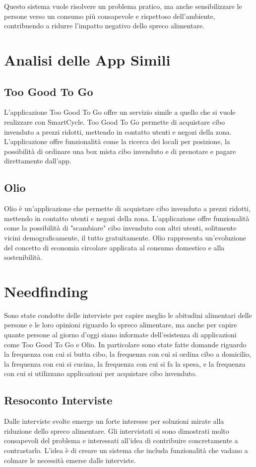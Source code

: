 \documentclass{article}
\begin{document}
Questo sistema vuole risolvere un problema pratico, ma anche sensibilizzare le persone verso un consumo più consapevole e rispettoso dell’ambiente, contribuendo a ridurre l’impatto negativo dello spreco alimentare.

\section{Analisi delle App Simili}
\subsection{Too Good To Go}
L'applicazione Too Good To Go offre un servizio simile a quello che si vuole realizzare con SmartCycle.
Too Good To Go permette di acquistare cibo invenduto a prezzi ridotti, mettendo in contatto utenti e negozi della zona.
L'applicazione offre funzionalità come la ricerca dei locali per posizione, la possibilità di ordinare una box mista cibo invenduto e di prenotare e pagare direttamente dall'app.

\subsection{Olio}
Olio è un'applicazione che permette di acquistare cibo invenduto a prezzi ridotti, mettendo in contatto utenti e negozi della zona.
L'applicazione offre funzionalità come la possibilità di "scambiare" cibo invenduto con altri utenti, solitmente vicini demograficamente, il tutto gratuitamente.
Olio rappresenta un’evoluzione del concetto di economia circolare applicata al consumo domestico e alla sostenibilità.

\section{Needfinding}
Sono state condotte delle interviste per capire meglio le abitudini alimentari delle persone e le loro opinioni riguardo lo spreco alimentare, ma anche per capire quante persone al giorno d'oggi siano informate dell'esistenza di applicazioni come Too Good To Go e Olio.
In particolare sono state fatte domande riguardo la frequenza con cui si butta cibo, la frequenza con cui si ordina cibo a domicilio, la frequenza con cui si cucina, la frequenza con cui si fa la spesa, e la frequenza con cui si utilizzano applicazioni per acquistare cibo invenduto.

\subsection{Resoconto Interviste}
Dalle interviste svolte emerge un forte interesse per soluzioni mirate alla riduzione dello spreco alimentare. 
Gli intervistati si sono dimostrati molto consapevoli del problema e interessati all’idea di contribuire concretamente a contrastarlo.
\newline
L'idea è di creare un sistema che includa funzionalità che vadano a colmare le necessità emerse dalle interviste.
\end{document}

